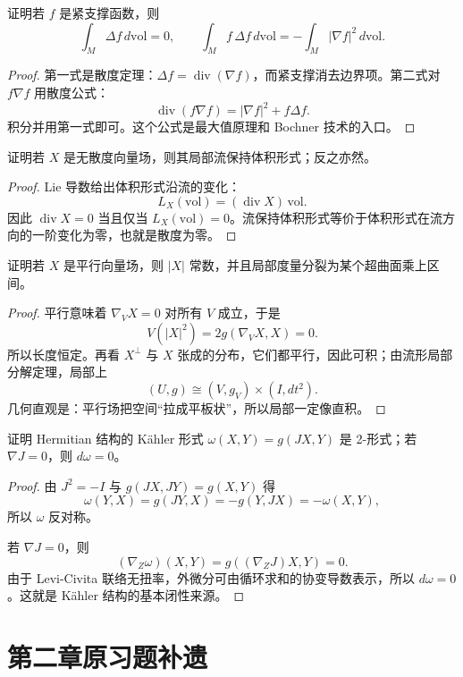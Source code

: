 \documentclass[11pt,a4paper,openany]{ctexbook}
\numberwithin{equation}{chapter}
\begin{document}
\begin{problem}
证明若 \(f\) 是紧支撑函数，则
\[
\int_M \Delta f\,d\mathrm{vol}=0,\qquad
\int_M f\,\Delta f\,d\mathrm{vol}=-\int_M |\nabla f|^2\,d\mathrm{vol}.
\]
\end{problem}
\begin{proof}
第一式是散度定理：\(\Delta f=\operatorname{div}(\nabla f)\)，而紧支撑消去边界项。第二式对 \(f\nabla f\) 用散度公式：
\[
\operatorname{div}(f\nabla f)=|\nabla f|^2+f\Delta f.
\]
积分并用第一式即可。这个公式是最大值原理和 Bochner 技术的入口。
\end{proof}

\begin{problem}
证明若 \(X\) 是无散度向量场，则其局部流保持体积形式；反之亦然。
\end{problem}
\begin{proof}
Lie 导数给出体积形式沿流的变化：
\[
L_X(\mathrm{vol})=(\operatorname{div}X)\,\mathrm{vol}.
\]
因此 \(\operatorname{div}X=0\) 当且仅当 \(L_X(\mathrm{vol})=0\)。流保持体积形式等价于体积形式在流方向的一阶变化为零，也就是散度为零。
\end{proof}

\begin{problem}
证明若 \(X\) 是平行向量场，则 \(|X|\) 常数，并且局部度量分裂为某个超曲面乘上区间。
\end{problem}
\begin{proof}
平行意味着 \(\nabla_VX=0\) 对所有 \(V\) 成立，于是
\[
V(|X|^2)=2g(\nabla_VX,X)=0.
\]
所以长度恒定。再看 \(X^\perp\) 与 \(X\) 张成的分布，它们都平行，因此可积；由流形局部分解定理，局部上
\[
(U,g)\cong (V,g_V)\times (I,dt^2).
\]
几何直观是：平行场把空间“拉成平板状”，所以局部一定像直积。
\end{proof}

\begin{problem}
证明 Hermitian 结构的 Kähler 形式 \(\omega(X,Y)=g(JX,Y)\) 是 2-形式；若 \(\nabla J=0\)，则 \(d\omega=0\)。
\end{problem}
\begin{proof}
由 \(J^2=-I\) 与 \(g(JX,JY)=g(X,Y)\) 得
\[
\omega(Y,X)=g(JY,X)=-g(Y,JX)=-\omega(X,Y),
\]
所以 \(\omega\) 反对称。

若 \(\nabla J=0\)，则
\[
(\nabla_Z\omega)(X,Y)=g((\nabla_ZJ)X,Y)=0.
\]
由于 Levi-Civita 联络无扭率，外微分可由循环求和的协变导数表示，所以 \(d\omega=0\)。这就是 Kähler 结构的基本闭性来源。
\end{proof}


\section{第二章原习题补遗}
\end{document}
